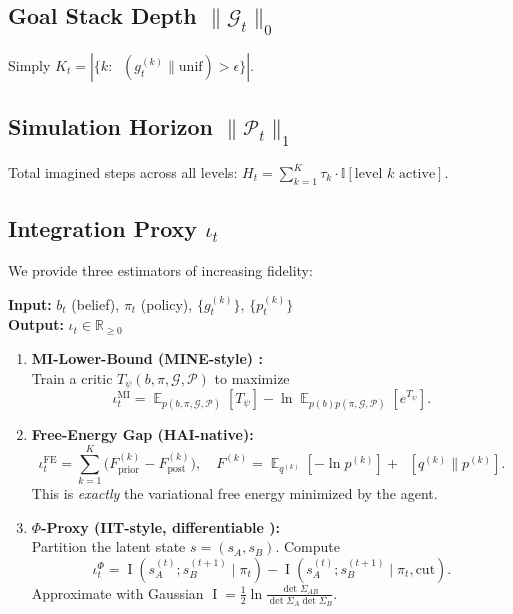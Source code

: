 \documentclass[11pt,a4paper]{article}
\DeclareMathOperator{\KL}{D_{\mathrm{KL}}}
\DeclareMathOperator{\MI}{I}
\DeclareMathOperator{\E}{\mathbb{E}}
\newcommand{\R}{\mathbb{R}}
\newcommand{\Gvec}{\mathcal{G}}
\newcommand{\Pvec}{\mathcal{P}}
\newcommand{\given}{\mid}
\begin{document}
\subsection{Goal Stack Depth $\|\Gvec_t\|_0$}
Simply $K_t = |\{ k : \KL(g^{(k)}_t \parallel \mathrm{unif}) > \epsilon \}|$.

\subsection{Simulation Horizon $\|\Pvec_t\|_1$}
Total imagined steps across all levels: $H_t = \sum_{k=1}^K \tau_k \cdot \mathbb{I}[\text{level $k$ active}]$.

\subsection{Integration Proxy $\iota_t$}
We provide three estimators of increasing fidelity:

\begin{algorithm}[H]
\caption{Differentiable Integration Estimators}
\label{alg:iota}
\textbf{Input:} $b_t$ (belief), $\pi_t$ (policy), $\{g^{(k)}_t\}$, $\{p^{(k)}_t\}$ \\
\textbf{Output:} $\iota_t \in \R_{\ge 0}$
\begin{enumerate}
    \item \textbf{MI-Lower-Bound (MINE-style) \cite{belghazi2018mine}:} \\
    Train a critic $T_\psi(b, \pi, \Gvec, \Pvec)$ to maximize
    \[
    \iota_t^{\mathrm{MI}} = \E_{p(b,\pi,\Gvec,\Pvec)}[T_\psi] - \ln \E_{p(b)p(\pi,\Gvec,\Pvec)}[e^{T_\psi}].
    \]
    \item \textbf{Free-Energy Gap (HAI-native):} \\
    \[
    \iota_t^{\mathrm{FE}} = \sum_{k=1}^K \bigl( F^{(k)}_{\mathrm{prior}} - F^{(k)}_{\mathrm{post}} \bigr), \quad
    F^{(k)} = \E_{q^{(k)}}[-\ln p^{(k)}] + \KL[q^{(k)} \parallel p^{(k)}].
    \]
    This is \emph{exactly} the variational free energy minimized by the agent.
    \item \textbf{$\Phi$-Proxy (IIT-style, differentiable \cite{oizumi2014phenomenology}):} \\
    Partition the latent state $s = (s_A, s_B)$. Compute
    \[
    \iota_t^\Phi = \MI( s_A^{(t)}; s_B^{(t+1)} \given \pi_t ) - \MI( s_A^{(t)}; s_B^{(t+1)} \given \pi_t, \text{cut} ).
    \]
    Approximate with Gaussian $\MI = \frac12 \ln \frac{\det\Sigma_{AB}}{\det\Sigma_A \det\Sigma_B}$.
\end{enumerate}
\end{algorithm}
\end{document}
